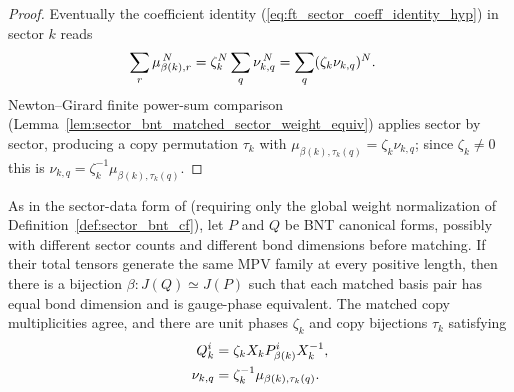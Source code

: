 \begin{proof}\leanok
    Eventually the coefficient identity
    (\ref{eq:ft_sector_coeff_identity_hyp}) in sector $k$ reads
    \begin{align}
        \sum_r \mu_{\beta(k),r}^{\,N}
         & = \zeta_k^N\sum_q\nu_{k,q}^{\,N}
        = \sum_q(\zeta_k\nu_{k,q})^{N}.
        \notag
    \end{align}
    Newton--Girard finite power-sum comparison
    (Lemma~\ref{lem:sector_bnt_matched_sector_weight_equiv}) applies sector by
    sector, producing a copy permutation $\tau_k$ with
    $\mu_{\beta(k),\tau_k(q)}=\zeta_k\nu_{k,q}$; since $\zeta_k\ne0$ this is
    $\nu_{k,q}=\zeta_k^{-1}\mu_{\beta(k),\tau_k(q)}$.
\end{proof}

\begin{corollary}%
    \label{thm:ft_sector_bnt_equal_sector_data_different_dims}
    \leanok
    As in the sector-data form of
    \cite[Corollary~2.11 and Appendix~A, lines~1182--1188]
    {Cirac2016MPDO_arXiv} (requiring only the global weight normalization of
    Definition~\ref{def:sector_bnt_cf}), let $P$ and $Q$ be BNT canonical
    forms, possibly with different sector counts and different bond dimensions
    before matching. If their total tensors generate the same MPV family at
    every positive length, then there is a bijection $\beta:J(Q)\simeq J(P)$
    such that each matched basis pair has equal bond dimension and is
    gauge-phase equivalent. The matched copy multiplicities agree, and there
    are unit phases $\zeta_k$ and copy bijections $\tau_k$ satisfying
    \begin{align}
        Q_k^i
         & =\zeta_kX_kP_{\beta(k)}^iX_k^{-1},
        \notag                                    \\
        \nu_{k,q}
         & =\zeta_k^{-1}\mu_{\beta(k),\tau_k(q)}.
        \notag
    \end{align}
\end{corollary}

